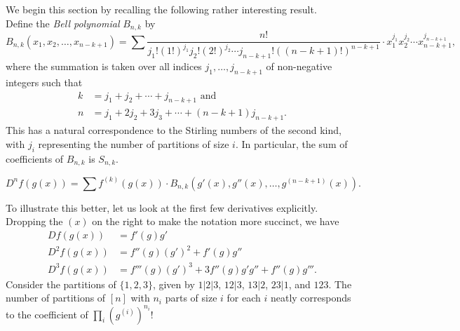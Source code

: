 	We begin this section by recalling the following rather interesting result.\\
	Define the \emph{Bell polynomial} $B_{n,k}$ by
	\[ B_{n,k}(x_1,x_2,\ldots,x_{n-k+1}) = \sum \frac{n!}{j_1! (1!)^{j_1} j_2! (2!)^{j_2} \cdots j_{n-k+1}! ((n-k+1)!)^{n-k+1}} \cdot x_1^{j_1} x_2^{j_2} \cdots x_{n-k+1}^{j_{n-k+1}}, \]
	where the summation is taken over all indices $j_1,\ldots,j_{n-k+1}$ of non-negative integers such that
	\begin{align*}
		k &= j_1 + j_2 + \cdots + j_{n-k+1} \text{ and} \\
		n &= j_1 + 2j_2 + 3j_3 + \cdots + (n-k+1)j_{n-k+1}.
	\end{align*}
	This has a natural correspondence to the Stirling numbers of the second kind, with $j_i$ representing the number of partitions of size $i$. In particular, the sum of coefficients of $B_{n,k}$ is $S_{n,k}$.

	\begin{fprop}
		\[ D^n f(g(x)) = \sum f^{(k)}(g(x)) \cdot B_{n,k} (g'(x), g''(x), \ldots, g^{(n-k+1)}(x)). \]
	\end{fprop}

	To illustrate this better, let us look at the first few derivatives explicitly. Dropping the $(x)$ on the right to make the notation more succinct, we have
	\begin{align*}
		Df(g(x)) &= f'(g) g' \\
		D^2f(g(x)) &= f''(g) (g')^2 + f'(g) g'' \\
		D^3f(g(x)) &= f'''(g) (g')^3 + 3 f''(g) g' g'' + f''(g) g'''.
	\end{align*}
	Consider the partitions of $\{1,2,3\}$, given by $1|2|3$, $12|3$, $13|2$, $23|1$, and $123$. The number of partitions of $[n]$ with $n_i$ parts of size $i$ for each $i$ neatly corresponds to the coefficient of $\prod_i (g^{(i)})^{n_i}$!


